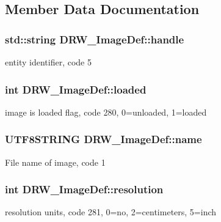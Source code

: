 \subsection{Member Data Documentation}
\hypertarget{class_d_r_w___image_def_a517f8cad9dd36a640779f3f1ed9600f7}{}
\subsubsection[{handle}]{\setlength{\rightskip}{0pt plus 5cm}std\+::string D\+R\+W\+\_\+\+Image\+Def\+::handle}\label{class_d_r_w___image_def_a517f8cad9dd36a640779f3f1ed9600f7}
entity identifier, code 5 \hypertarget{class_d_r_w___image_def_a2265a01592e1b25b1a4c6294423f76f6}{}
\subsubsection[{loaded}]{\setlength{\rightskip}{0pt plus 5cm}int D\+R\+W\+\_\+\+Image\+Def\+::loaded}\label{class_d_r_w___image_def_a2265a01592e1b25b1a4c6294423f76f6}
image is loaded flag, code 280, 0=unloaded, 1=loaded \hypertarget{class_d_r_w___image_def_abd0cb813e416eba0b541beb90ba8a1c4}{}
\subsubsection[{name}]{\setlength{\rightskip}{0pt plus 5cm}U\+T\+F8\+S\+T\+R\+I\+N\+G D\+R\+W\+\_\+\+Image\+Def\+::name}\label{class_d_r_w___image_def_abd0cb813e416eba0b541beb90ba8a1c4}
File name of image, code 1 \hypertarget{class_d_r_w___image_def_a4bc6163d679744d2f58c00cb5d6573b0}{}
\subsubsection[{resolution}]{\setlength{\rightskip}{0pt plus 5cm}int D\+R\+W\+\_\+\+Image\+Def\+::resolution}\label{class_d_r_w___image_def_a4bc6163d679744d2f58c00cb5d6573b0}
resolution units, code 281, 0=no, 2=centimeters, 5=inch \hypertarget{class_d_r_w___image_def_afe11ccfebf55c9ec07a92cda8f09d98c}{}
